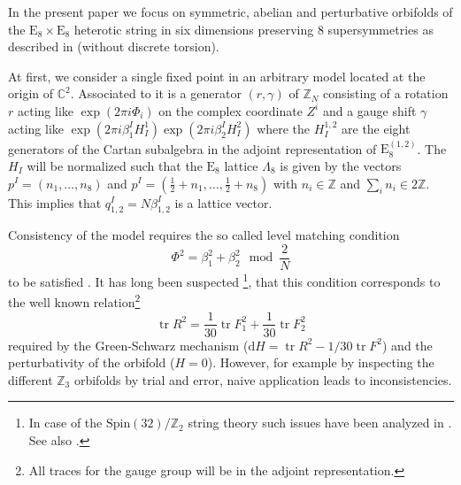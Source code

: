 \documentclass[a4paper,12pt,twoside]{article}
\numberwithin{equation}{section}
\newcommand{\Spin}{\text{Spin}} %
\newcommand{\pE}{\text{E}  }     %
\newcommand{\mC}{\mathbb{C}}
\newcommand{\mZ}{\mathbb{Z}}
\newcommand{\Dd}{\text{d}}      %
\DeclareMathOperator{\tr}{tr}
\begin{document}
In the present paper we focus on symmetric, abelian and perturbative
orbifolds of the $\pE_8 \times \pE_8$ heterotic string in six
dimensions preserving 8 supersymmetries as described in \cite{OrbI,
  OrbII} (without discrete torsion).

At first, we consider a single fixed point in an arbitrary model
located at the origin of $\mC^2$. Associated to it is a generator
$(r,\gamma)$ of $\mZ_N$ consisting of a rotation $r$ acting like
$\exp(2\pi i \Phi_i)$ on the complex coordinate $Z^i$ and a gauge
shift $\gamma$ acting like $\exp(2\pi i \beta^I_1 H^1_I) \exp(2\pi i
\beta_2^I H^2_I)$ where the $H_I^{1,2}$ are the eight generators of
the Cartan subalgebra in the adjoint representation of
$\pE_8^{(1,2)}$. The $H_I$ will be normalized such that the $\pE_8$
lattice $\Lambda_8$ is given by the vectors $p^I = (n_1, \ldots, n_8)$
and $p^I = (\tfrac{1}{2} + n_1, \ldots, \tfrac{1}{2} + n_8)$ with $n_i
\in \mZ$ and $\sum_i n_i \in 2\mZ$. This implies that $q^I_{1,2} =
N\beta^I_{1,2}$ is a lattice vector.

Consistency of the model requires the so called level
matching condition
\begin{equation}
  \label{eq:level}
  \Phi^2 = \beta_1^2 + \beta_2^2 \mod \frac{2}{N}
\end{equation}
to be satisfied \cite{OrbII,Vafa:1986wx}. It has long been suspected
\cite{PrivNilles, Aldazabal}\footnote{%
  In case of the $\Spin(32)/\mZ_2$ string theory such issues have been
  analyzed in \cite{Berkooz,Intriligator}. See also \cite{Aldazabal}.
  }, that this condition corresponds to the well known
relation\footnote{All traces for the gauge group will be in the
  adjoint representation.}
\begin{equation}
  \label{eq:GreenSchwarz}
  \tr R^2 = \frac{1}{30} \tr F_1^2 + \frac{1}{30} \tr F_2^2
\end{equation}
required by the Green-Schwarz mechanism \cite{GreenSchwarz} ($\Dd H =
\tr R^2 - 1/30 \tr F^2$) and the perturbativity of the orbifold ($H =
0$). However, for example by inspecting the different $\mZ_3$
orbifolds by trial and error, naive application leads to
inconsistencies.
\end{document}
